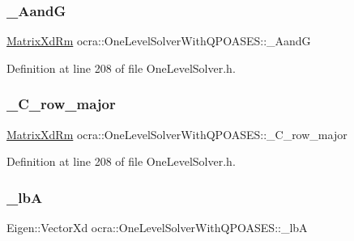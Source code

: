 \subsubsection{\texorpdfstring{\+\_\+\+AandG}{\_AandG}}
{\footnotesize\ttfamily \hyperlink{group__solver_ga70eb87299c2fc1db3c4aac05df67d889}{Matrix\+Xd\+Rm} ocra\+::\+One\+Level\+Solver\+With\+Q\+P\+O\+A\+S\+E\+S\+::\+\_\+\+AandG\hspace{0.3cm}{\ttfamily [protected]}}



Definition at line 208 of file One\+Level\+Solver.\+h.

\hypertarget{classocra_1_1OneLevelSolverWithQPOASES_a5ad3c2a2670e8d7862735fefe2df6553}{}\label{classocra_1_1OneLevelSolverWithQPOASES_a5ad3c2a2670e8d7862735fefe2df6553} 
\subsubsection{\texorpdfstring{\+\_\+\+C\+\_\+row\+\_\+major}{\_C\_row\_major}}
{\footnotesize\ttfamily \hyperlink{group__solver_ga70eb87299c2fc1db3c4aac05df67d889}{Matrix\+Xd\+Rm} ocra\+::\+One\+Level\+Solver\+With\+Q\+P\+O\+A\+S\+E\+S\+::\+\_\+\+C\+\_\+row\+\_\+major\hspace{0.3cm}{\ttfamily [protected]}}



Definition at line 208 of file One\+Level\+Solver.\+h.

\hypertarget{classocra_1_1OneLevelSolverWithQPOASES_a3004e673e3f883cfba0b53f0a078ccd4}{}\label{classocra_1_1OneLevelSolverWithQPOASES_a3004e673e3f883cfba0b53f0a078ccd4} 
\subsubsection{\texorpdfstring{\+\_\+lbA}{\_lbA}}
{\footnotesize\ttfamily Eigen\+::\+Vector\+Xd ocra\+::\+One\+Level\+Solver\+With\+Q\+P\+O\+A\+S\+E\+S\+::\+\_\+lbA\hspace{0.3cm}{\ttfamily [protected]}}



